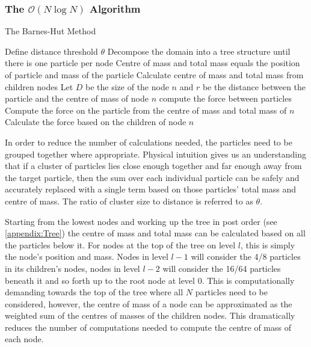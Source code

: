 \subsubsection{\texorpdfstring{The $\mathcal{O}(N\log N)$ Algorithm}{The O(NlogN) Algorithm}}

\begin{algorithm}
\caption{The Barnes-Hut Method}\label{alg:BarnesHut}
\begin{algorithmic}
\State Define distance threshold $\theta$
\State Decompose the domain into a tree structure until there is one particle per node
\State Centre of mass and total mass equals the position of particle and mass of the particle
\Else 
\State Calculate centre of mass and total mass from children nodes
\EndIf
\EndFor
{}
\State Let $D$ be the size of the node $n$ and $r$ be the distance between the particle and the centre of mass of node $n$
\State compute the force between particles 
\Else
{}
\State Compute the force on the particle from the centre of mass and total mass  
\State of $n$
\Else
\State Calculate the force based on the children of node $n$
\EndIf
\EndIf
\EndFor
\end{algorithmic}
\end{algorithm}

In order to reduce the number of calculations needed, the particles need to be grouped together where appropriate. Physical intuition gives us an understanding that if a cluster of particles lies close enough together and far enough away from the target particle, then the sum over each individual particle can be safely and accurately replaced with a single term based on those particles' total mass and centre of mass. The ratio of cluster size to distance is referred to as $\theta$. 

Starting from the lowest nodes and working up the tree in post order (see \cref{appendix:Tree}) the centre of mass and total mass can be calculated based on all the particles below it. For nodes at the top of the tree on level $l$, this is simply the node's position and mass. Nodes in level $l-1$ will consider the 4/8 particles in its children's nodes, nodes in level $l-2$ will consider the 16/64 particles beneath it and so forth up to the root node at level $0$. This is computationally demanding towards the top of the tree where all $N$ particles need to be considered, however, the centre of mass of a node can be approximated as the weighted sum of the centres of masses of the children nodes. This dramatically reduces the number of computations needed to compute the centre of mass of each node. 

